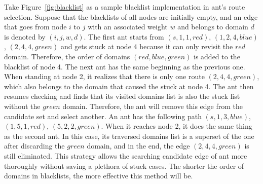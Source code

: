 Take Figure~\ref{fig:blacklist} as a sample blacklist implementation in ant's route selection. Suppose that the blacklists of all nodes are initially empty, and an edge that goes from node $i$ to $j$ with an associated weight $w$ and belongs to domain $d$ is denoted by $(i, j, w, d)$. The first ant starts from $(s, 1, 1, red)$, $(1, 2, 4, blue)$, $(2, 4, 4, green)$ and gets stuck at node 4 because it can only revisit the $red$ domain. Therefore, the order of domains $(red, blue, green)$ is added to the blacklist of node 4. The next ant has the same beginning as the previous one. When standing at node 2, it realizes that there is only one route $(2, 4, 4, green)$, which also belongs to the domain that caused the stuck at node 4. The ant then resumes checking and finds that its visited domains list is also the stuck list without the $green$ domain. Therefore, the ant will remove this edge from the candidate set and select another. An ant has the following path $(s, 1, 3, blue)$, $(1, 5, 1, red)$, $(5, 2, 2, green)$. When it reaches node 2, it does the same thing as the second ant. In this case, its traversed domains list is a superset of the one after discarding the $green$ domain, and in the end, the edge $(2, 4, 4, green)$ is still eliminated. This strategy allows the searching candidate edge of ant more thoroughly without saving a plethora of stuck cases. The shorter the order of domains in blacklists, the more effective this method will be.